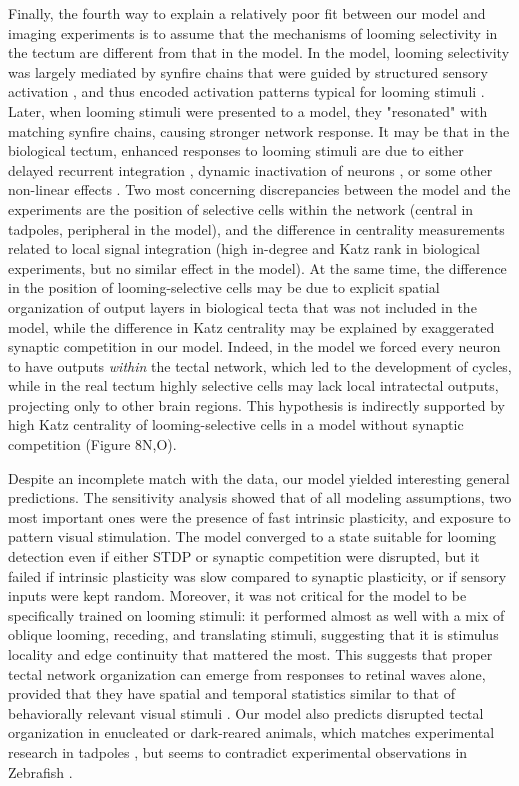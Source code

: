 \documentclass{article}
\begin{document}
Finally, the fourth way to explain a relatively poor fit between our model and imaging experiments is to assume that the mechanisms of looming selectivity in the tectum are different from that in the model. In the model, looming selectivity was largely mediated by synfire chains \citep{zheng2014synfire,cohen2002synreview} that were guided by structured sensory activation \citep{vislay2006rf,clopath2010stdpcoding}, and thus encoded activation patterns typical for looming stimuli \citep{pratt2008recurrent,richards2010stdp}. Later, when looming stimuli were presented to a model, they "resonated" with matching synfire chains, causing stronger network response. It may be that in the biological tectum, enhanced responses to looming stimuli are due to either delayed recurrent integration \citep{khakhalin2014,jang2016}, dynamic inactivation of neurons \citep{fotowat2011multiplexing}, or some other non-linear effects \citep{baginskas2009recurrent}. Two most concerning discrepancies between the model and the experiments are  the position of selective cells within the network (central in tadpoles, peripheral in the model), and the difference in centrality measurements related to local signal integration (high in-degree and Katz rank in biological experiments, but no similar effect in the model). At the same time, the difference in the position of looming-selective cells may be due to explicit spatial organization of output layers in biological tecta that was not included in the model, while the difference in Katz centrality may be explained by exaggerated synaptic competition in our model. Indeed, in the model we forced every neuron to have outputs \textit{within} the tectal network, which led to the development of cycles, while in the real tectum highly selective cells may lack local intratectal outputs, projecting only to other brain regions. This hypothesis is indirectly supported by high Katz centrality of looming-selective cells in a model without synaptic competition (Figure 8N,O).

Despite an incomplete match with the data, our model yielded interesting general predictions. The sensitivity analysis showed that of all modeling assumptions, two most important ones were the presence of fast intrinsic plasticity, and exposure to pattern visual stimulation. The model converged to a state suitable for looming detection even if either STDP or synaptic competition were disrupted, but it failed if intrinsic plasticity was slow compared to synaptic plasticity, or if sensory inputs were kept random. Moreover, it was not critical for the model to be specifically trained on looming stimuli: it performed almost as well with a mix of oblique looming, receding, and translating stimuli, suggesting that it is stimulus locality and edge continuity that mattered the most. This suggests that proper tectal network organization can emerge from responses to retinal waves alone, provided that they have spatial and temporal statistics similar to that of behaviorally relevant visual stimuli \citep{huberman2008waves}. Our model also predicts disrupted tectal organization in enucleated or dark-reared animals, which matches experimental research in tadpoles \citep{xu2011}, but seems to contradict experimental observations in Zebrafish \citep{pietri2017emergence}.
\end{document}
